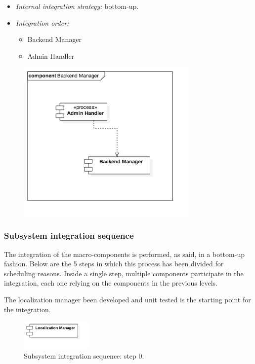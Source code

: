 			\begin{itemize}[label={},leftmargin=*,noitemsep,topsep=0pt]
				\item \textit{Internal integration strategy:} bottom-up.
				\item \textit{Integration order:}
					\begin{itemize}[noitemsep]
						\item Backend Manager
						\item Admin Handler
					\end{itemize}
			\end{itemize}
			\begin{figure}[h]
				\includegraphics[width=250pt, center]{img/integration_strategy/subcomponents/backend_manager.png}
			\end{figure}
		\FloatBarrier

	\subsubsection{Subsystem integration sequence}
	\label{sec:subsystem_integration_sequence}
		The integration of the macro-components is performed, as said, in a bottom-up fashion. Below are the 5 steps in which this process has been divided for scheduling reasons. Inside a single step, multiple components participate in the integration, each one relying on the components in the previous levels.

			The localization manager been developed and unit tested is the starting point for the integration.
			\begin{figure}[h]
				\includegraphics[width=100pt,center]{img/integration_strategy/steps/high_level_components_lv0.png}
				\caption{Subsystem integration sequence: step 0.}
			\end{figure}
		\FloatBarrier

